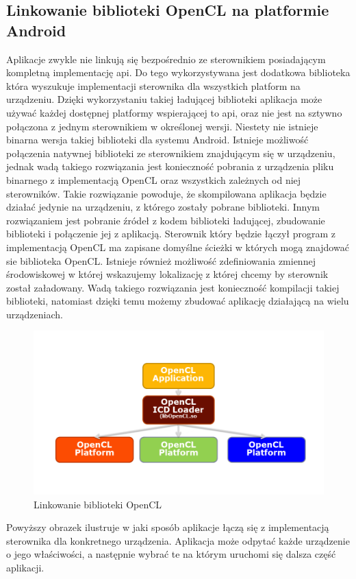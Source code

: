 \subsection{Linkowanie biblioteki OpenCL na platformie Android}
Aplikacje zwykle nie linkują się bezpośrednio ze sterownikiem posiadającym kompletną implementację api. Do tego wykorzystywana jest dodatkowa biblioteka która wyszukuje implementacji sterownika dla wszystkich platform na urządzeniu. Dzięki wykorzystaniu takiej ładującej biblioteki aplikacja może używać każdej dostępnej platformy wspierającej to api, oraz nie jest na sztywno połączona z jednym sterownikiem w określonej wersji.
Niestety nie istnieje binarna wersja takiej biblioteki dla systemu Android. Istnieje możliwość połączenia natywnej biblioteki ze sterownikiem znajdującym się w urządzeniu, jednak wadą takiego rozwiązania jest konieczność pobrania z urządzenia pliku binarnego z implementacją OpenCL oraz wszystkich zależnych od niej sterowników. Takie rozwiązanie powoduje, że skompilowana aplikacja będzie działać jedynie na urządzeniu, z którego zostały pobrane biblioteki.
Innym rozwiązaniem jest pobranie źródeł z kodem biblioteki ładującej, zbudowanie biblioteki i połączenie jej z aplikacją. Sterownik który będzie łączył program z implementacją OpenCL ma zapisane domyślne ścieżki w których mogą znajdować sie biblioteka OpenCL. Istnieje również możliwość zdefiniowania zmiennej środowiskowej w której wskazujemy lokalizację z której chcemy by sterownik został załadowany. Wadą takiego rozwiązania jest konieczność kompilacji takiej biblioteki, natomiast dzięki temu możemy zbudować aplikację działającą na wielu urządzeniach.
\begin{figure}[H]
	\includegraphics[scale=0.4]{imgs/icdLoader.png}
	\caption{Linkowanie biblioteki OpenCL \cite{Loader}}
\end{figure}
Powyższy obrazek ilustruje w jaki sposób aplikacje łączą się z implementacją sterownika dla konkretnego urządzenia. Aplikacja może odpytać każde urządzenie o jego właściwości, a następnie wybrać te na którym uruchomi się dalsza część aplikacji.

